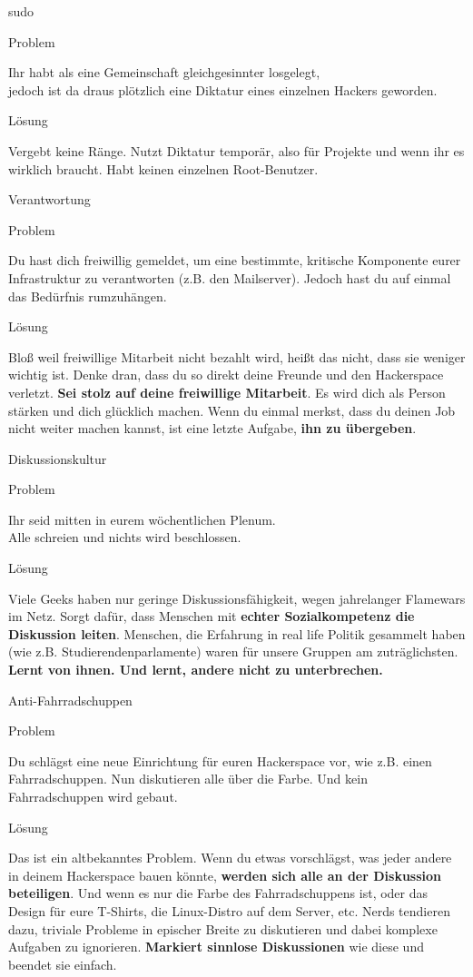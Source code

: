 \documentclass[aspectratio=1610]{beamer}
\newcommand{\pattern}[2]{
  \begin{alertblock}{Problem}
    #1
  \end{alertblock}
  \pause
  \begin{exampleblock}{Lösung}
    #2
  \end{exampleblock}
}
\begin{document}
  \begin{frame}{sudo}
    \pattern{
      Ihr habt als eine Gemeinschaft gleichgesinnter losgelegt,\\
      jedoch ist da draus plötzlich eine Diktatur eines einzelnen Hackers geworden.
    }{
      Vergebt keine Ränge. Nutzt Diktatur temporär, also für Projekte und wenn
      ihr es wirklich braucht. Habt keinen einzelnen Root-Benutzer.
    }
  \end{frame}

  \begin{frame}{Verantwortung}
    \pattern{
      Du hast dich freiwillig gemeldet, um eine bestimmte, kritische Komponente
      eurer Infrastruktur zu verantworten (z.B. den Mailserver). Jedoch hast du
      auf einmal das Bedürfnis rumzuhängen.
    }{
      Bloß weil freiwillige Mitarbeit nicht bezahlt wird, heißt das nicht, dass
      sie weniger wichtig ist. Denke dran, dass du so direkt deine Freunde und
      den Hackerspace verletzt. \textbf{Sei stolz auf deine freiwillige
      Mitarbeit}. Es wird dich als Person stärken und dich glücklich machen.
      Wenn du einmal merkst, dass du deinen Job nicht weiter machen kannst, ist
      eine letzte Aufgabe, \textbf{ihn zu übergeben}.
    }
  \end{frame}

  \begin{frame}{Diskussionskultur}
    \pattern{
      Ihr seid mitten in eurem wöchentlichen Plenum.\\
      Alle schreien und nichts wird beschlossen.
    }{
      Viele Geeks haben nur geringe Diskussionsfähigkeit, wegen jahrelanger Flamewars
      im Netz. Sorgt dafür, dass Menschen mit \textbf{echter Sozialkompetenz die
      Diskussion leiten}. Menschen, die Erfahrung in real life Politik gesammelt
      haben (wie z.B. Studierendenparlamente) waren für unsere Gruppen am
      zuträglichsten. \textbf{Lernt von ihnen. Und lernt, andere nicht zu
      unterbrechen.}
    }
  \end{frame}

  \begin{frame}{Anti-Fahrradschuppen}
    \pattern{
      Du schlägst eine neue Einrichtung für euren Hackerspace vor, wie z.B.
      einen Fahrradschuppen. Nun diskutieren alle über die Farbe. Und kein
      Fahrradschuppen wird gebaut.
    }{
      Das ist ein altbekanntes Problem. Wenn du etwas vorschlägst, was jeder
      andere in deinem Hackerspace bauen könnte, \textbf{werden sich alle an der
      Diskussion beteiligen}. Und wenn es nur die Farbe des Fahrradschuppens
      ist, oder das Design für eure T-Shirts, die Linux-Distro auf dem Server,
      etc. Nerds tendieren dazu, triviale Probleme in epischer Breite zu
      diskutieren und dabei komplexe Aufgaben zu ignorieren. \textbf{Markiert
      sinnlose Diskussionen} wie diese und beendet sie einfach.
    }
  \end{frame}
\end{document}

